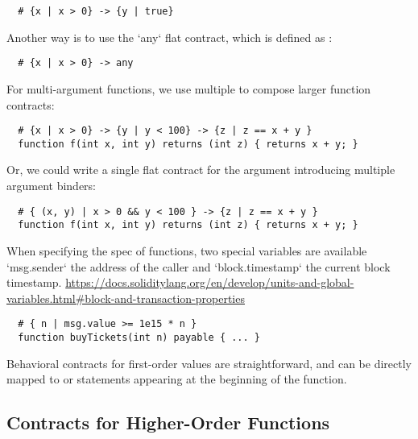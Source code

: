 \documentclass[acmsmall,review,anonymous]{acmart}\settopmatter{printfolios=true,printccs=false,printacmref=false}
\begin{document}
\begin{lstlisting}
  # {x | x > 0} -> {y | true}
\end{lstlisting}
Another way is to use the `any` flat contract, which is defined as
:
\begin{lstlisting}
  # {x | x > 0} -> any
\end{lstlisting}

For multi-argument functions, we use multiple \code{->} to compose larger function
contracts:
\begin{lstlisting}
  # {x | x > 0} -> {y | y < 100} -> {z | z == x + y }
  function f(int x, int y) returns (int z) { returns x + y; }
\end{lstlisting}
Or, we could write a single flat contract for the argument introducing
multiple argument binders:
\begin{lstlisting}
  # { (x, y) | x > 0 && y < 100 } -> {z | z == x + y }
  function f(int x, int y) returns (int z) { returns x + y; }
\end{lstlisting}

When specifying the spec of functions, two special variables are available
`msg.sender` the address of the caller and `block.timestamp` the current
block timestamp.
\url{https://docs.soliditylang.org/en/develop/units-and-global-variables.html#block-and-transaction-properties}

\begin{lstlisting}
  # { n | msg.value >= 1e15 * n }
  function buyTickets(int n) payable { ... }
\end{lstlisting}

Behavioral contracts for first-order values are straightforward,
and can be directly mapped to  or  statements
appearing at the beginning of the function.

\subsection{Contracts for Higher-Order Functions}

\iffalse
	\begin{lstlisting}
function map(uint[] memory data, function (uint) pure returns (uint) f)
  internal pure returns (uint[] memory r)
{
  r = new uint[](data.length);
  for (uint i = 0; i < data.length; i++) {
    r[i] = f(data[i]);
  }
}
\end{lstlisting}
\fi
\end{document}
